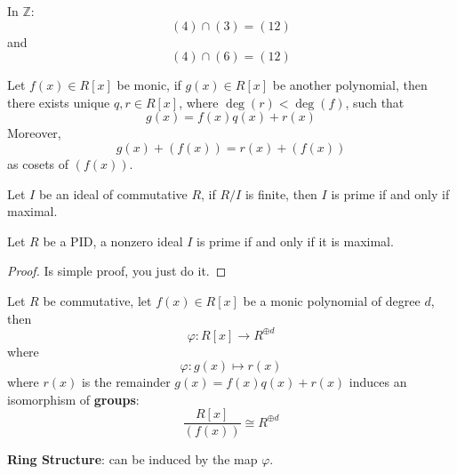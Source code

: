 \documentclass[openany]{book}
\newcommand{\Z}{\mathbb{Z}}
\begin{document}
\begin{example}
    In $\Z$:
    \begin{equation*}
        (4)\cap(3)=(12)
    \end{equation*}
    and 
    \begin{equation*}
        (4)\cap(6)=(12)
    \end{equation*}
\end{example}
\begin{defn}
    Let $f(x)\in R[x]$ be monic, if $g(x)\in R[x]$ be another polynomial, then there exists unique $q,r\in R[x]$, where $\deg(r)<\deg(f)$, such that 
    \begin{equation*}
        g(x)=f(x)q(x)+r(x)
    \end{equation*}
    Moreover, 
    \begin{equation*}
        g(x)+(f(x))=r(x)+(f(x))
    \end{equation*}
    as cosets of $(f(x))$.
\end{defn}



\begin{prop}
    Let $I$ be an ideal of commutative $R$, if $R/I$ is finite, then $I$ is prime if and only if maximal.
\end{prop}

\begin{prop}
    Let $R$ be a PID, a nonzero ideal $I$ is prime if and only if it is maximal.
\end{prop}
\begin{proof}
    Is simple proof, you just do it.
\end{proof}


\begin{thm}
    Let $R$ be commutative, let $f(x)\in R[x]$ be a monic polynomial of degree $d$, then 
    \begin{equation*}
        \varphi: R[x]\to R^{\oplus d}
    \end{equation*}
    where 
    \begin{equation*}
        \varphi: g(x)\mapsto r(x)
    \end{equation*}
    where $r(x)$ is the remainder $g(x)=f(x)q(x)+r(x)$ induces an isomorphism of \textbf{groups}:
    \begin{equation*}
        \frac{R[x]}{(f(x))}\cong R^{\oplus d}
    \end{equation*}
\end{thm}
\textbf{Ring Structure}: can be induced by the map $\varphi$.
\end{document}
